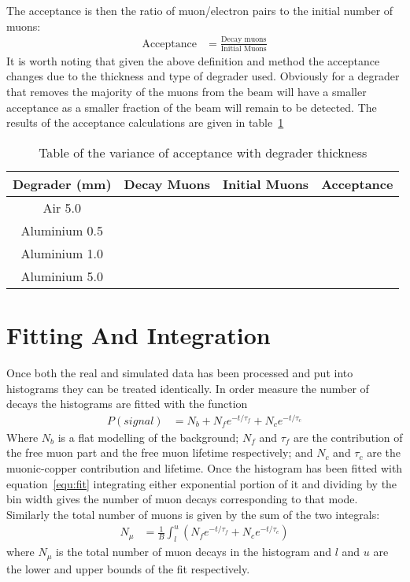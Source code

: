 \documentclass[]{article}
\begin{document}
The acceptance is then the ratio of muon/electron pairs to the initial number of muons:
\begin{align}
    \text{Acceptance} &= \frac{\text{Decay muons}}{\text{Initial Muons}} \label{equ:acceptance}
\end{align}
It is worth noting that given the above definition and method the acceptance changes due to the thickness and type of degrader used. Obviously for a degrader that removes the majority of the muons from the beam will have a smaller acceptance as a smaller fraction of the beam will remain to be detected. The results of the acceptance calculations are given in table~\ref{tab:acceptance}
\begin{table}
    \begin{center}
    \begin{tabular}{c| r@{ $\pm$ }l | r@{ $\pm$ }l | r@{ $\pm$ }l }
        Degrader (mm) & \multicolumn{2}{|c}{Decay Muons} & \multicolumn{2}{|c}{Initial Muons} & \multicolumn{2}{|c}{Acceptance}\\
        \hline
        Air 5.0       &   &   &   &   &   &   \\
        Aluminium 0.5 &   &   &   &   &   &   \\
        Aluminium 1.0 &   &   &   &   &   &   \\
        Aluminium 5.0 &   &   &   &   &   &   \\
    \end{tabular}
    \end{center}
    \caption{Table of the variance of acceptance with degrader thickness}
    \label{tab:acceptance}
\end{table}
\section{Fitting And Integration} %
\label{sec:fitting_and_integration}
Once both the real and simulated data has been processed and put into histograms they can be treated identically. In order measure the number of decays the histograms are fitted with the function 
\begin{align}
    P(signal) &= N_{b} + N_{f}e^{-t / \tau_{f}} + N_{c} e^{-t / \tau_{c}} \label{equ:fit}
\end{align}
Where $N_{b}$ is a flat modelling of the background; $N_{f}$ and $\tau_{f}$ are the contribution of the free muon part and the free muon lifetime respectively; and $N_{c}$ and $\tau_{c}$ are the muonic-copper contribution and lifetime. Once the histogram has been fitted with equation~\ref{equ:fit} integrating either exponential portion of it and dividing by the bin width gives the number of muon decays corresponding to that mode. Similarly the total number of muons is given by the sum of the two integrals:
\begin{align}
    N_{\mu} &= \frac{1}{B} \int_{l}^{u}\left(N_{f}e^{-t / \tau_{f}} + N_{c} e^{-t / \tau_{c}} \right) \label{equ:sum_exp_parts}
\end{align}
where $N_{\mu}$ is the total number of muon decays in the histogram and $l$ and $u$ are the lower and upper bounds of the fit respectively. 
\end{document}
